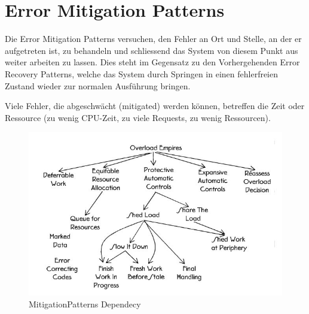 \section{Error Mitigation Patterns}


Die Error Mitigation Patterns versuchen, den Fehler an Ort und Stelle, an der er aufgetreten ist, zu behandeln und schliessend das System von diesem Punkt aus weiter arbeiten zu lassen. Dies steht im Gegensatz zu den Vorhergehenden Error Recovery Patterns, welche das System durch Springen in einen fehlerfreien Zustand wieder zur normalen Ausführung bringen.

Viele Fehler, die abgeschwächt (mitigated) werden können, betreffen die Zeit oder Ressource (zu wenig CPU-Zeit, zu viele Requests, zu wenig Ressourcen).

\begin{figure}[H]
	\centering
	\includegraphics[width=\textwidth]{content/faulttolerance/images/MitigationPatterns_Dependecy.JPG}
	\caption{MitigationPatterns Dependecy}
\end{figure}


